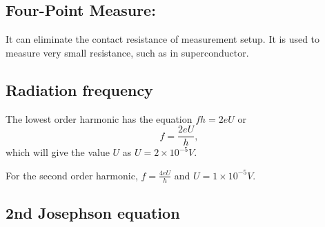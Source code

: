 \subsection{Four-Point Measure:}

It can eliminate the contact resistance of measurement setup. It is
used to measure very small resistance, such as in superconductor.

\subsection{Radiation frequency}

The lowest order harmonic has the equation $fh=2eU$ or 
\begin{equation}
f=\frac{2eU}{h},
\end{equation}
 which will give the value $U$ as $U=2\times10^{-5}V$.

For the second order harmonic, $f=\frac{4eU}{h}$ and $U=1\times10^{-5}V$.

\subsection{2nd Josephson equation}

